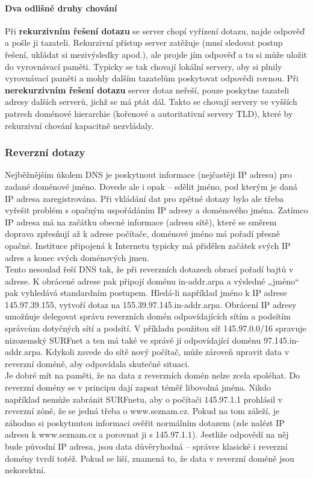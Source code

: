 \documentclass[10pt,a4paper]{article}
\begin{document}
\paragraph{Dva odlišné druhy chování} Při \textbf{rekurzivním řešení dotazu} se server chopí vyřízení dotazu, najde odpověď a pošle ji tazateli. Rekurzivní přístup server zatěžuje (musí sledovat postup řešení, ukládat si mezivýsledky apod.), ale projde jím odpověď a tu si může uložit do vyrovnávací paměti. Typicky se tak chovají lokální servery, aby si plnily vyrovnávací paměti a mohly dalším tazatelům poskytovat odpovědi rovnou. Při \textbf{nerekurzivním řešení dotazu} server dotaz neřeší, pouze poskytne tazateli adresy dalších serverů, jichž se má ptát dál. Takto se chovají servery ve vyšších patrech doménové hierarchie (kořenové a autoritativní servery TLD), které by rekurzivní chování kapacitně nezvládaly.

\subsubsection{Reverzní dotazy}
Nejběžnějším úkolem DNS je poskytnout informace (nejčastěji IP adresu) pro zadané doménové jméno. Dovede ale i opak – sdělit jméno, pod kterým je daná IP adresa zaregistrována. Při vkládání dat pro zpětné dotazy bylo ale třeba vyřešit problém s opačným uspořádáním IP adresy a doménového jména. Zatímco IP adresa má na začátku obecné informace (adresu sítě), které se směrem doprava zpřesňují až k adrese počítače, doménové jméno má pořadí přesně opačné. Instituce připojená k Internetu typicky má přidělen začátek svých IP adres a konec svých doménových jmen. \\
Tento nesoulad řeší DNS tak, že při reverzních dotazech obrací pořadí bajtů v adrese. K obrácené adrese pak připojí doménu in-addr.arpa a výsledné „jméno“ pak vyhledává standardním postupem. Hledá-li například jméno k IP adrese 145.97.39.155, vytvoří dotaz na 155.39.97.145.in-addr.arpa. Obrácení IP adresy umožňuje delegovat správu reverzních domén odpovídajících sítím a podsítím správcům dotyčných sítí a podsítí. V příkladu použitou síť 145.97.0.0/16 spravuje nizozemský SURFnet a ten má také ve správě jí odpovídající doménu 97.145.in-addr.arpa. Kdykoli zavede do sítě nový počítač, může zároveň upravit data v reverzní doméně, aby odpovídala skutečné situaci. \\
Je dobré mít na paměti, že na data z reverzních domén nelze zcela spoléhat. Do reverzní domény se v principu dají zapsat téměř libovolná jména. Nikdo například nemůže zabránit SURFnetu, aby o počítači 145.97.1.1 prohlásil v reverzní zóně, že se jedná třeba o www.seznam.cz. Pokud na tom záleží, je záhodno si poskytnutou informaci ověřit normálním dotazem (zde nalézt IP adresu k www.seznam.cz a porovnat ji s 145.97.1.1). Jestliže odpovědí na něj bude původní IP adresa, jsou data důvěryhodná – správce klasické i reverzní domény tvrdí totéž. Pokud se liší, znamená to, že data v reverzní doméně jsou nekorektní.
\end{document}
